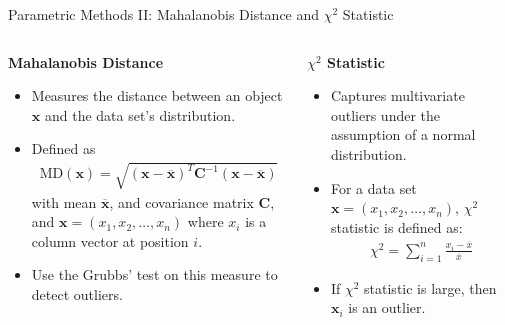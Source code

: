 \begin{frame}{Parametric Methods II: Mahalanobis Distance and $\chi^2$ Statistic}
	\vspace*{-2em}
	\begin{columns}[t]
		\begin{column}{0.5\textwidth}
			\begin{center}
				\textbf{Mahalanobis Distance}
			\end{center}
			\vspace*{-1em}
			\begin{itemize}
				\item Measures the distance between an object $\mathbf{x}$ and the data set's distribution.
				\item Defined as
				      \begin{align*}
					      \text{MD}(\mathbf{x}) = \sqrt{(\mathbf{x} - \mathbf{\overline{x}})^T \mathbf{C}^{-1} (\mathbf{x} - \mathbf{\overline{x}})}
				      \end{align*}
				      with mean $\mathbf{\overline{x}}$, and covariance matrix $\mathbf{C}$, and $\mathbf{x}=(x_1, x_2, \dots, x_n)$ where $x_i$ is a column vector at position $i$.
				\item Use the Grubbs' test on this measure to detect outliers.
			\end{itemize}
		\end{column}

		\begin{column}{0.5\textwidth}
			\begin{center}
				\textbf{$\chi^2$ Statistic}
			\end{center}
			\vspace*{-1em}
			\begin{itemize}
				\item Captures multivariate outliers under the assumption of a normal distribution.
				\item For a data set $\mathbf{x}=(x_1, x_2, \dots, x_n)$, $\chi^2$ statistic is defined as:
				      \begin{align*}
					      \chi^2 = \sum_{i=1}^n \frac{x_i - \overline{x}}{\overline{x}}
				      \end{align*}
				\item If $\chi^2$ statistic is large, then $\mathbf{x}_i$ is an outlier.
			\end{itemize}
		\end{column}
	\end{columns}
\end{frame}

